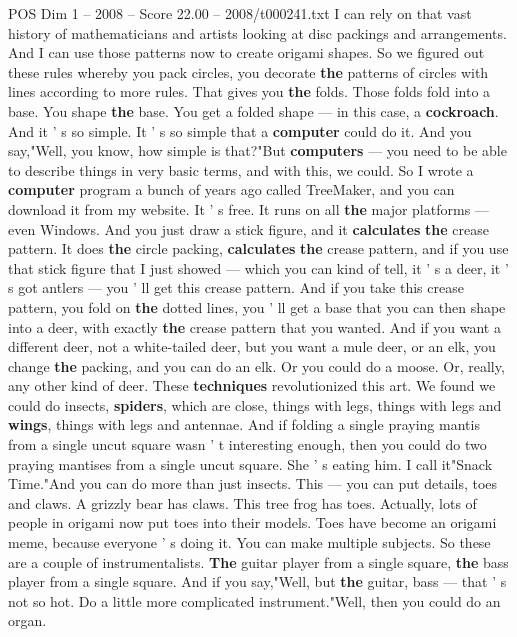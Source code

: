 \begin{textsample}{POS Dim 1 – 2008 – Score 22.00 – 2008/t000241.txt}
I can rely on that vast history of mathematicians and artists looking at disc packings and arrangements.
And I can use those patterns now to create origami shapes.
So we figured out these rules whereby you pack circles, you decorate \textbf{the} patterns of circles with lines according to more rules.
That gives you \textbf{the} folds.
Those folds fold into a base.
You shape \textbf{the} base.
You get a folded shape — in this case, a \textbf{cockroach}.
And it ' s so simple.
It ' s so simple that a \textbf{computer} could do it.
And you say,"Well, you know, how simple is that?"But \textbf{computers} — you need to be able to describe things in very basic terms, and with this, we could.
So I wrote a \textbf{computer} program a bunch of years ago called TreeMaker, and you can download it from my website.
It ' s free.
It runs on all \textbf{the} major platforms — even Windows.
And you just draw a stick figure, and it \textbf{calculates} \textbf{the} crease pattern.
It does \textbf{the} circle packing, \textbf{calculates} \textbf{the} crease pattern, and if you use that stick figure that I just showed — which you can kind of tell, it ' s a deer, it ' s got antlers — you ' ll get this crease pattern.
And if you take this crease pattern, you fold on \textbf{the} dotted lines, you ' ll get a base that you can then shape into a deer, with exactly \textbf{the} crease pattern that you wanted.
And if you want a different deer, not a white-tailed deer, but you want a mule deer, or an elk, you change \textbf{the} packing, and you can do an elk.
Or you could do a moose.
Or, really, any other kind of deer.
These \textbf{techniques} revolutionized this art.
We found we could do insects, \textbf{spiders}, which are close, things with legs, things with legs and \textbf{wings}, things with legs and antennae.
And if folding a single praying mantis from a single uncut square wasn ' t interesting enough, then you could do two praying mantises from a single uncut square.
She ' s eating him.
I call it"Snack Time."And you can do more than just insects.
This — you can put details, toes and claws.
A grizzly bear has claws.
This tree frog has toes.
Actually, lots of people in origami now put toes into their models.
Toes have become an origami meme, because everyone ' s doing it.
You can make multiple subjects.
So these are a couple of instrumentalists. \textbf{The} guitar player from a single square, \textbf{the} bass player from a single square.
And if you say,"Well, but \textbf{the} guitar, bass — that ' s not so hot.
Do a little more complicated instrument."Well, then you could do an organ.

\end{textsample}
